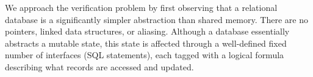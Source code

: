 


We approach the verification problem by first observing that a
relational database is a significantly simpler abstraction than shared
memory. There are no pointers, linked data structures, or aliasing.
Although a database essentially abstracts a mutable state, this state
is affected through a well-defined fixed number of interfaces (SQL
statements), each tagged with a logical formula describing what
records are accessed and updated.

